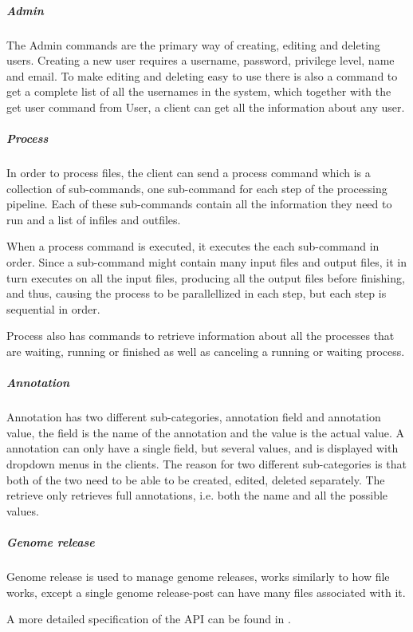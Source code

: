 \subparagraph*{Admin}

The Admin commands are the primary way of creating, editing and deleting users. Creating a new user requires a username, password, privilege level, name and email. To make editing and deleting easy to use there is also a command to get a complete list of all the usernames in the system, which together with the get user command from User, a client can get all the information about any user. 

\subparagraph*{Process}

In order to process files, the client can send a process command which is a collection of sub-commands, one sub-command for each step of the processing pipeline. Each of these sub-commands contain all the information they need to run and a list of infiles and outfiles. 

When a process command is executed, it executes the each sub-command in order. Since a sub-command might contain many input files and output files, it in turn executes on all the input files, producing all the output files before finishing, and thus, causing the process to be parallellized in each step, but each step is sequential in order.

Process also has commands to retrieve information about all the processes that are waiting, running or finished as well as canceling a running or waiting process. 

\subparagraph*{Annotation}

Annotation has two different sub-categories, annotation field and annotation value, the field is the name of the annotation and the value is the actual value. A annotation can only have a single field, but several values, and is displayed with dropdown menus in the clients. The reason for two different sub-categories is that both of the two need to be able to be created, edited, deleted separately. The retrieve only retrieves full annotations, i.e. both the name and all the possible values. 

\subparagraph*{Genome release}

Genome release is used to manage genome releases, works similarly to how file works, except a single genome release-post can have many files associated with it. 

A more detailed specification of the API can be found in .
